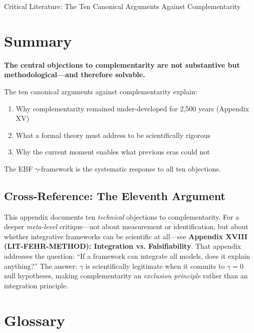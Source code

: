\begin{chapter}{Critical Literature: The Ten Canonical Arguments Against Complementarity}
\section{Summary}
\label{sec:summary}

\begin{tcolorbox}[colback=blue!5!white,colframe=blue!75!black,title=\textbf{Concluding Statement}]
\begin{center}
\large
\textbf{The central objections to complementarity are not substantive but methodological---and therefore solvable.}
\end{center}

\vspace{0.5em}
The ten canonical arguments against complementarity explain:
\begin{enumerate}
    \item Why complementarity remained under-developed for 2,500 years (Appendix XV)
    \item What a formal theory must address to be scientifically rigorous
    \item Why the current moment enables what previous eras could not
\end{enumerate}

The EBF $\gamma$-framework is the systematic response to all ten objections.
\end{tcolorbox}

\subsection{Cross-Reference: The Eleventh Argument}

This appendix documents ten \textit{technical} objections to complementarity. For a
deeper \textit{meta-level} critique---not about measurement or identification, but
about whether integrative frameworks can be scientific at all---see \textbf{Appendix XVIII
(LIT-FEHR-METHOD): Integration vs. Falsifiability}. That appendix addresses the
question: ``If a framework can integrate all models, does it explain anything?''
The answer: $\gamma$ is scientifically legitimate when it commits to $\gamma = 0$
null hypotheses, making complementarity an \textit{exclusion principle} rather than
an integration principle.

\section{Glossary}
\label{sec:glossary}


\end{chapter}

